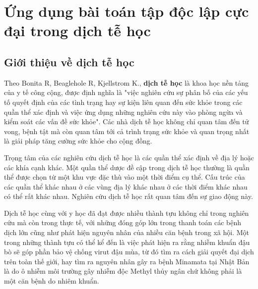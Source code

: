 \documentclass[14pt, oneside, a4paper, openany]{scrartcl}
\begin{document}


\newpage
{}
\section{Ứng dụng bài toán tập độc lập cực đại trong dịch tễ học}
\subsection{Giới thiệu về dịch tễ học}
Theo Bonita R, Beaglehole R, Kjellstrom K.\cite{BasicEpid}, \textbf{dịch tễ học}   là khoa học nền tảng của y tế công cộng, được định nghĩa là "việc nghiên cứu sự phân bố của các yếu tố quyết định của các tình trạng hay sự kiện liên quan đến sức khỏe trong các quần thể xác định và việc ứng dụng những nghiên cứu này vào phòng ngừa và kiểm soát các vấn đề sức khỏe". 
Các nhà dịch tễ học không chỉ quan tâm đến tử vong, bệnh tật mà còn quan tâm tới cả trình trạng sức khỏe và quan trọng nhất là giải pháp tăng cường sức khỏe cho cộng đồng.

Trọng tâm của các nghiên cứu dịch tễ học là các quần thể xác định về địa lý hoặc các khía cạnh khác. Một quần thể dược đề cập trong dịch tễ học thường là quần thể được chọn từ một khu vực đặc thù vào một thời điểm cụ thể. Cấu trúc của các quần thể khác nhau ở các vùng địa lý khác nhau ở các thời điểm khác nhau có thể rất khác nhau. Nghiên cứu dịch tễ học rất quan tâm đến sự giao động này.

Dịch tễ học cùng với y học đã đạt được nhiều thành tựu không chỉ trong nghiên cứu mà còn trong thực tế, với những đóng góp lớn trong thanh toán các bệnh dịch lớn cũng như phát hiện nguyên nhân của nhiều căn bệnh trong xã hội. 
Một trong những thành tựu có thể kể đến là việc phát hiện ra rằng nhiễm khuẩn đậu bò sẽ góp phần bảo vệ chống virut đậu mùa, từ đó tìm ra cách giải quyết đại dịch trên toàn thế giới, hay tìm ra nguyên nhân gây ra bệnh Minamata tại Nhật Bản là do ô nhiễm môi trường gây nhiễm độc Methyl thủy ngân chứ không phải là một căn bệnh do nhiêm khuẩn.
\end{document}
